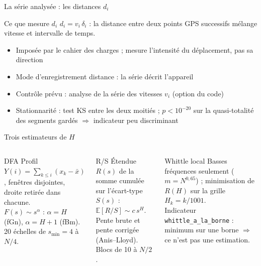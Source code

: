 \documentclass[aspectratio=169,11pt]{beamer}
\newcommand{\code}[1]{\texttt{#1}}
\begin{document}
\begin{frame}{La série analysée : les distances $d_i$}
\begin{block}{Ce que mesure $d_i$}
$d_i=v_i\,\delta_i$ : la distance entre deux points GPS successifs mélange \alert{vitesse} et \alert{intervalle de temps}.
\end{block}
\begin{itemize}
  \item Imposée par le cahier des charges ; mesure l'\alert{intensité} du déplacement, pas sa direction
  \item Mode d'enregistrement \og distance \fg{} : la série décrit l'appareil
  \item Contrôle prévu : analyse de la série des vitesses $v_i$ (option du code)
  \item Stationnarité : test KS entre les deux moitiés ; $p<10^{-20}$ sur la quasi-totalité des segments gardés \(\Rightarrow\) indicateur peu discriminant
\end{itemize}
\end{frame}

\begin{frame}{Trois estimateurs de $H$}
\footnotesize
\begin{columns}[T]
\begin{block}{DFA}
Profil $Y(i)=\sum_{k\le i}(x_k-\bar x)$, fenêtres disjointes, droite retirée dans chacune.\\[1mm]
$F(s)\sim s^{\alpha}$ : $\alpha=H$ (fGn), $\alpha=H+1$ (fBm).\\[1mm]
20 échelles de $s_{\min}=4$ à $N/4$.
\end{block}
\begin{block}{R/S}
Étendue $R(s)$ de la somme cumulée sur l'écart-type $S(s)$ :\\
$\mathbb E[R/S]\sim c\,s^{H}$.\\[1mm]
Pente \alert{brute} et pente \alert{corrigée} (Anis--Lloyd).\\[1mm]
Blocs de 10 à $N/2$.
\end{block}
\begin{block}{Whittle local}
Basses fréquences seulement ($m=N^{0{,}65}$) ; minimisation de $R(H)$ sur la grille $H_k=k/1001$.\\[1mm]
Indicateur \code{whittle\_a\_la\_borne} : minimum sur une borne $\Rightarrow$ ce n'est pas une estimation.
\end{block}
\end{columns}
\end{frame}
\end{document}
